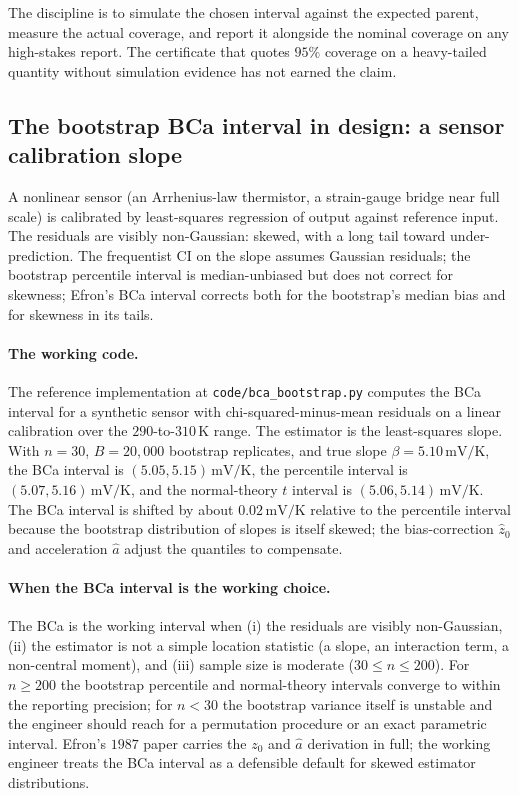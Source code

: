 The discipline is to simulate the chosen interval against the
expected parent, measure the actual coverage, and report it
alongside the nominal coverage on any high-stakes report.
The certificate that quotes $95\%$ coverage on a heavy-tailed
quantity without simulation evidence has not earned the claim.

\subsection{The bootstrap BCa interval in design: a sensor
calibration slope}

A nonlinear sensor (an Arrhenius-law thermistor, a strain-gauge
bridge near full scale) is calibrated by least-squares
regression of output against reference input. The residuals
are visibly non-Gaussian: skewed, with a long tail toward
under-prediction. The frequentist CI on the slope assumes
Gaussian residuals; the bootstrap percentile interval is
median-unbiased but does not correct for skewness;
Efron's BCa interval \cite{paper:ch04t3b-efron-bca-1987}
corrects both for the bootstrap's median bias and for
skewness in its tails.

\paragraph{The working code.} The reference implementation at
\texttt{code/bca\_bootstrap.py} computes the BCa interval for
a synthetic sensor with chi-squared-minus-mean residuals on a
linear calibration over the $290$-to-$310\,\si{\kelvin}$
range. The estimator is the least-squares slope. With
$n = 30$, $B = 20{,}000$ bootstrap replicates, and true slope
$\beta = 5.10\,\si{\milli\volt}/\si{\kelvin}$, the BCa interval
is $(5.05, 5.15)\,\si{\milli\volt}/\si{\kelvin}$, the
percentile interval is $(5.07, 5.16)\,\si{\milli\volt}/\si{
\kelvin}$, and the normal-theory $t$ interval is $(5.06,
5.14)\,\si{\milli\volt}/\si{\kelvin}$. The BCa interval is
shifted by about $0.02\,\si{\milli\volt}/\si{\kelvin}$ relative
to the percentile interval because the bootstrap distribution
of slopes is itself skewed; the bias-correction $\hat{z}_{0}$
and acceleration $\hat{a}$ adjust the quantiles to compensate.

\paragraph{When the BCa interval is the working choice.} The
BCa is the working interval when (i) the residuals are visibly
non-Gaussian, (ii) the estimator is not a simple location
statistic (a slope, an interaction term, a non-central
moment), and (iii) sample size is moderate
($30 \leq n \leq 200$). For $n \geq 200$ the bootstrap
percentile and normal-theory intervals converge to within the
reporting precision; for $n < 30$ the bootstrap variance
itself is unstable and the engineer should reach for a
permutation procedure or an exact parametric interval. Efron's
$1987$ paper carries the $z_{0}$ and $\hat{a}$ derivation in
full; the working engineer treats the BCa interval as a
defensible default for skewed estimator distributions.

